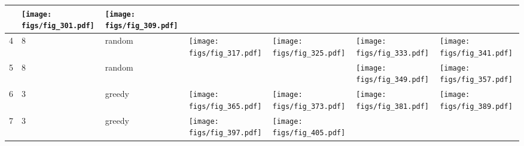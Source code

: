 \documentclass[oneside,canadian,landscape]{article}
\begin{document}
\begin{center}
\begin{longtable}{|l|l|l||l|l|l|l|}
\begin{minipage}{3.5cm}
\end{minipage}
&\begin{minipage}{3.5cm}
\texttt{[image: figs/fig\_301.pdf]}
\end{minipage}
&\begin{minipage}{3.5cm}
\texttt{[image: figs/fig\_309.pdf]}
\end{minipage}
\\ \hline
4&8&random&\begin{minipage}{3.5cm}
\texttt{[image: figs/fig\_317.pdf]}
\end{minipage}
&\begin{minipage}{3.5cm}
\texttt{[image: figs/fig\_325.pdf]}
\end{minipage}
&\begin{minipage}{3.5cm}
\texttt{[image: figs/fig\_333.pdf]}
\end{minipage}
&\begin{minipage}{3.5cm}
\texttt{[image: figs/fig\_341.pdf]}
\end{minipage}
\\ \hline
5&8&random&&&\begin{minipage}{3.5cm}
\texttt{[image: figs/fig\_349.pdf]}
\end{minipage}
&\begin{minipage}{3.5cm}
\texttt{[image: figs/fig\_357.pdf]}
\end{minipage}
\\ \hline
6&3&greedy&\begin{minipage}{3.5cm}
\texttt{[image: figs/fig\_365.pdf]}
\end{minipage}
&\begin{minipage}{3.5cm}
\texttt{[image: figs/fig\_373.pdf]}
\end{minipage}
&\begin{minipage}{3.5cm}
\texttt{[image: figs/fig\_381.pdf]}
\end{minipage}
&\begin{minipage}{3.5cm}
\texttt{[image: figs/fig\_389.pdf]}
\end{minipage}
\\ \hline
7&3&greedy&\begin{minipage}{3.5cm}
\texttt{[image: figs/fig\_397.pdf]}
\end{minipage}
&\begin{minipage}{3.5cm}
\texttt{[image: figs/fig\_405.pdf]}
\end{minipage}

\end{longtable}
\end{center}
\end{document}
